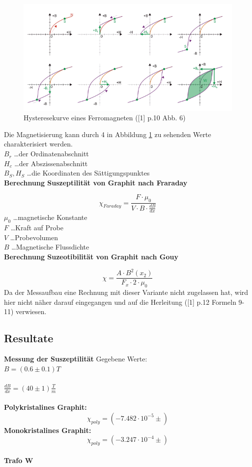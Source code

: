 \documentclass[12pt,a4paper]{article}
\begin{document}
\begin{multicols}{2}
\begin{figure}[H]
	\centering
	\includegraphics[scale=0.3]{./figures/hysterese.png}
	\caption{Hysteresekurve eines Ferromagneten ([1] p.10 Abb. 6)}
	\label{fig:hysterese}
\end{figure}

\noindent
Die Magnetisierung kann durch 4 in Abbildung \ref{fig:hysterese} zu sehenden Werte charakterisiert werden.\\
$B_r$ \ldots der Ordinatenabschnitt\\
$H_c$ \ldots der Abszissenabschnitt\\
$B_S, H_S$ \ldots die Koordinaten des Sättigungspunktes\\


\textbf{Berechnung Suszeptilität von Graphit nach Fraraday}

$$\chi_{Faraday} = \frac{F \cdot \mu_0}{V \cdot B \cdot \frac{dB}{dx}}$$
$\mu_0$ \ldots magnetische Konstante\\
$F$ \ldots Kraft auf Probe\\
$V$ \ldots Probevolumen\\
$B$ \ldots Magnetische Flussdichte\\

\noindent
\textbf{Berechnung Suzeotibilität von Graphit nach Gouy}

$$\chi = \frac{A \cdot B^2(x_2)}{F_x \cdot 2 \cdot \mu_{0}} $$
Da der Messaufbau eine Rechnung mit dieser Variante nicht zugelassen hat, wird hier nicht näher darauf eingegangen und auf die Herleitung ([1] p.12 Formeln 9-11) verwiesen.

\subsection{Resultate}
\textbf{Messung der Suszeptilität}
Gegebene Werte:\\
$B = (0.6 \pm 0.1)T$\\
\\
$\frac{dB}{dx} = (40 \pm 1) \frac{T}{m}$\\
\\
\textbf{Polykristalines Graphit:}
$$\chi_{poly} = (-7.482 \cdot 10^{-5} \pm )$$
\textbf{Monokristalines Graphit:}
$$\chi_{poly} = (-3.247 \cdot 10^{-4} \pm )$$
\\
\noindent
\textbf{Trafo W}\\


\end{multicols}
\end{document}
